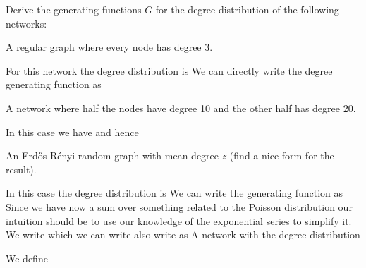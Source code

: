 \label{exGeneratingDegreeGF}
Derive the generating functions $G$ for the degree distribution of the following networks:  

\subquestion A regular graph where every node has degree 3.

\solution
For this network the degree distribution is 
We can directly write the degree generating function as 

\subquestion A network where half the nodes have degree 10 and the other half has degree 20.

\solution
In this case we have 
and hence 

\subquestion An Erd\H{o}s-R\'enyi random graph with mean degree $z$ (find a nice form for the result). 

\solution
In this case the degree distribution is 
We can write the generating function as 
Since we have now a sum over something related to the Poisson distribution our intuition should be to use our knowledge of the exponential series to simplify it. We write 
which we can write also write as 
\subquestion A network with the degree distribution 

\solution
We define

